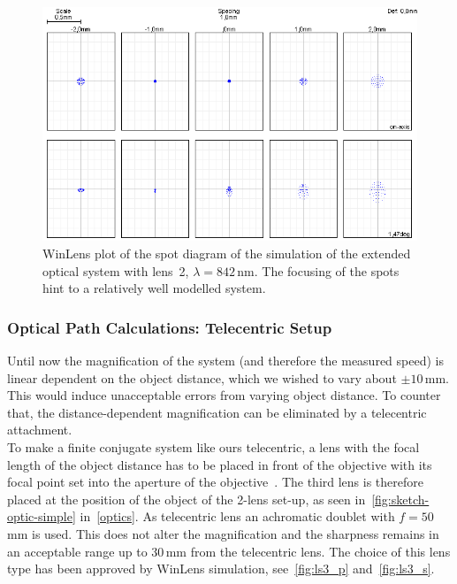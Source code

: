 \documentclass[12pt,a4paper]{article}
\begin{document}
\begin{figure}[htbp]
\begin{center}
\includegraphics[width=1\columnwidth]{figures/spot_diagram_2lenses.png}
\caption{\label{fig:ls2_s}
WinLens plot of the spot diagram of the simulation of the extended optical system with lens~2, $\lambda = 842$\,nm.
The focusing of the spots hint to a relatively well modelled system.
}
\end{center}
\end{figure}

\subsubsection{Optical Path Calculations: Telecentric Setup}

Until now the magnification of the system (and therefore the measured speed) is linear dependent on the object distance, which we wished to vary about $\pm 10$\,mm.
This would induce unacceptable errors from varying object distance.
To counter that, the distance-dependent magnification can be eliminated by a telecentric attachment.\\
To make a finite conjugate system like ours telecentric, a lens with the focal length of the object distance has to be placed in front of the objective with its focal point set into the aperture of the objective~\cite{telec}.
The third lens is therefore placed at the position of the object of the 2-lens set-up, as seen in~\autoref{fig:sketch-optic-simple} in~\autoref{optics}.
As telecentric lens an achromatic doublet with $f=50$\,mm is used.
This does not alter the magnification and the sharpness remains in an acceptable range up to 30\,mm from the telecentric lens.
The choice of this lens type has been approved by WinLens simulation, see~\autoref{fig:ls3_p} and~\autoref{fig:ls3_s}.
\end{document}
